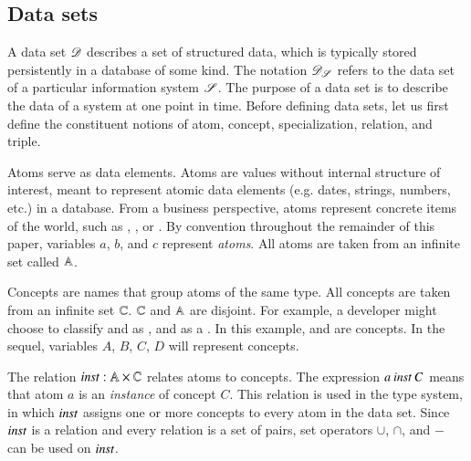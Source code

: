\documentclass{elsarticle}
\begin{document}
\subsection{Data sets}
\label{sct:Data sets}
   A data set $\mathscr{D}$ describes a set of structured data, which is typically stored persistently in a database of some kind.
   The notation $\mathscr{D}_{\mathscr{S}}$ refers to the data set of a particular information system $\mathscr{S}$.
   The purpose of a data set is to describe the data of a system at one point in time. 
   Before defining data sets, let us first define the constituent notions of atom, concept, specialization, relation, and triple.
   
   Atoms serve as data elements.
   Atoms are values without internal structure of interest, meant to represent atomic data elements (e.g. dates, strings, numbers, etc.) in a database.
   From a business perspective, atoms represent concrete items of the world,
   such as , , or .
   By convention throughout the remainder of this paper, variables $a$, $b$, and $c$ represent \emph{atoms}.
   All atoms are taken from an infinite set called $\mathbb{A}$.
   
   Concepts are names that group atoms of the same type.
   All concepts are taken from an infinite set $\mathbb{C}$.
   $\mathbb{C}$ and $\mathbb{A}$ are disjoint.
   For example, a developer might choose to classify  and  as ,
   and  as a .
   In this example,  and  are concepts.
   In the sequel, variables $A$, $B$, $C$, $D$ will represent concepts.

   The relation $\mathbin{\text{\it inst\/}}:\mathbb{A}\times\mathbb{C}$ relates atoms to concepts.
   The expression $a\mathbin{\text{\it inst\/}} C$ means that atom $a$ is an \emph{instance} of concept $C$.
   This relation is used in the type system, in which $\mathbin{\text{\it inst\/}}$ assigns one or more concepts to every atom in the data set.
   Since $\mathbin{\text{\it inst\/}}$ is a relation and every relation is a set of pairs,
   set operators $\cup$, $\cap$, and $-$ can be used on $\mathbin{\text{\it inst\/}}$.

\end{document}
